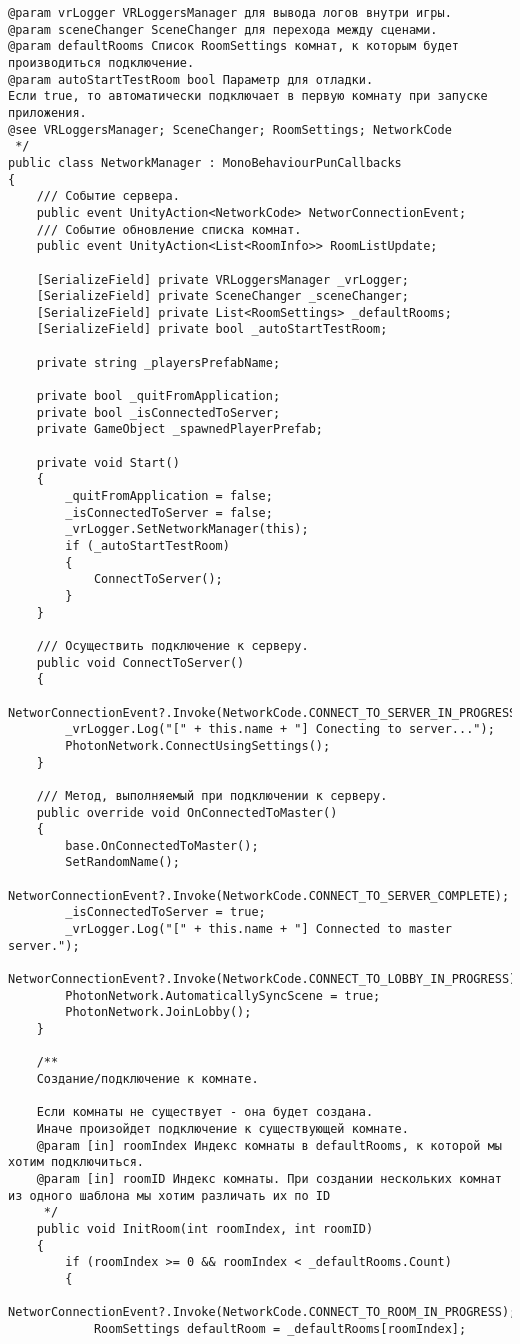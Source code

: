 \begin{verbatim}
@param vrLogger VRLoggersManager для вывода логов внутри игры.
@param sceneChanger SceneChanger для перехода между сценами.
@param defaultRooms Список RoomSettings комнат, к которым будет производиться подключение.
@param autoStartTestRoom bool Параметр для отладки. 
Если true, то автоматически подключает в первую комнату при запуске приложения.
@see VRLoggersManager; SceneChanger; RoomSettings; NetworkCode
 */
public class NetworkManager : MonoBehaviourPunCallbacks
{
    /// Событие сервера.
    public event UnityAction<NetworkCode> NetworConnectionEvent;
    /// Событие обновление списка комнат.
    public event UnityAction<List<RoomInfo>> RoomListUpdate;

    [SerializeField] private VRLoggersManager _vrLogger;
    [SerializeField] private SceneChanger _sceneChanger;
    [SerializeField] private List<RoomSettings> _defaultRooms;
    [SerializeField] private bool _autoStartTestRoom;

    private string _playersPrefabName;

    private bool _quitFromApplication;
    private bool _isConnectedToServer;
    private GameObject _spawnedPlayerPrefab;

    private void Start()
    {
        _quitFromApplication = false;
        _isConnectedToServer = false;
        _vrLogger.SetNetworkManager(this);
        if (_autoStartTestRoom)
        {
            ConnectToServer();
        }
    }

    /// Осуществить подключение к серверу.
    public void ConnectToServer()
    {
        NetworConnectionEvent?.Invoke(NetworkCode.CONNECT_TO_SERVER_IN_PROGRESS);
        _vrLogger.Log("[" + this.name + "] Conecting to server...");
        PhotonNetwork.ConnectUsingSettings();
    }

    /// Метод, выполняемый при подключении к серверу.
    public override void OnConnectedToMaster()
    {
        base.OnConnectedToMaster();
        SetRandomName();
        NetworConnectionEvent?.Invoke(NetworkCode.CONNECT_TO_SERVER_COMPLETE);
        _isConnectedToServer = true;
        _vrLogger.Log("[" + this.name + "] Connected to master server.");
        NetworConnectionEvent?.Invoke(NetworkCode.CONNECT_TO_LOBBY_IN_PROGRESS);
        PhotonNetwork.AutomaticallySyncScene = true;
        PhotonNetwork.JoinLobby();
    }

    /**
    Создание/подключение к комнате.

    Если комнаты не существует - она будет создана. 
    Иначе произойдет подключение к существующей комнате.
    @param [in] roomIndex Индекс комнаты в defaultRooms, к которой мы хотим подключиться.
    @param [in] roomID Индекс комнаты. При создании нескольких комнат из одного шаблона мы хотим различать их по ID
     */
    public void InitRoom(int roomIndex, int roomID)
    {
        if (roomIndex >= 0 && roomIndex < _defaultRooms.Count)
        {
            NetworConnectionEvent?.Invoke(NetworkCode.CONNECT_TO_ROOM_IN_PROGRESS);
            RoomSettings defaultRoom = _defaultRooms[roomIndex];


\end{verbatim}

